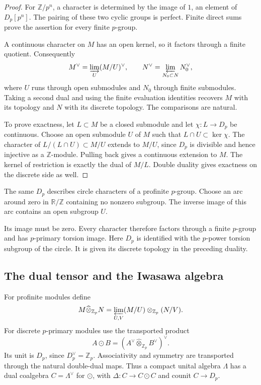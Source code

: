 \begin{proof}
For $\mathbb Z/p^n$, a character is determined by the image of $1$,
an element of $D_p[p^n]$. The pairing of these two cyclic groups is
perfect. Finite direct sums prove the assertion for every finite
$p$-group.

A continuous character on $M$ has an open kernel, so it factors
through a finite quotient. Consequently
\[
 M^\vee=\varinjlim_U(M/U)^\vee,
 \qquad N^\vee=\varprojlim_{N_0\subset N}N_0^\vee,
\]
where $U$ runs through open submodules and $N_0$ through finite
submodules. Taking a second dual and using the finite evaluation
identities recovers $M$ with its topology and $N$ with its discrete
topology. The comparisons are natural.

To prove exactness, let $L\subset M$ be a closed submodule and let
$\chi:L\to D_p$ be continuous. Choose an open submodule $U$ of
$M$ such that $L\cap U\subset\ker\chi$. The character of
$L/(L\cap U)\subset M/U$ extends to $M/U$, since $D_p$ is
divisible and hence injective as a $\mathbb Z$-module. Pulling back
gives a continuous extension to $M$. The kernel of restriction is
exactly the dual of $M/L$. Double duality gives exactness on the
discrete side as well.
\end{proof}

The same $D_p$ describes circle characters of a profinite $p$-group.
Choose an arc around zero in $\mathbb R/\mathbb Z$ containing no
nonzero subgroup. The inverse image of this arc contains an open
subgroup $U$.

Its image must be zero. Every character therefore
factors through a finite $p$-group and has $p$-primary torsion image.
Here $D_p$ is identified with the $p$-power torsion subgroup of the
circle. It is given its discrete topology in the preceding duality.

\subsection{The dual tensor and the Iwasawa algebra}

For profinite modules define
\[
 M\widehat\otimes_{\mathbb Z_p}N
 =\varprojlim_{U,V}(M/U)\otimes_{\mathbb Z_p}(N/V).
\]
For discrete $p$-primary modules use the transported product
\begin{equation}\label{v4-arith:md:eq:dual-tensor}
 A\odot B=(A^\vee\widehat\otimes_{\mathbb Z_p}B^\vee)^\vee.
\end{equation}
Its unit is $D_p$, since $D_p^\vee=\mathbb Z_p$.
Associativity and symmetry are transported through the natural
double-dual maps. Thus a compact unital algebra $\Lambda$ has a
dual coalgebra $C=\Lambda^\vee$ for $\odot$, with
$\Delta:C\to C\odot C$ and counit $C\to D_p$.

